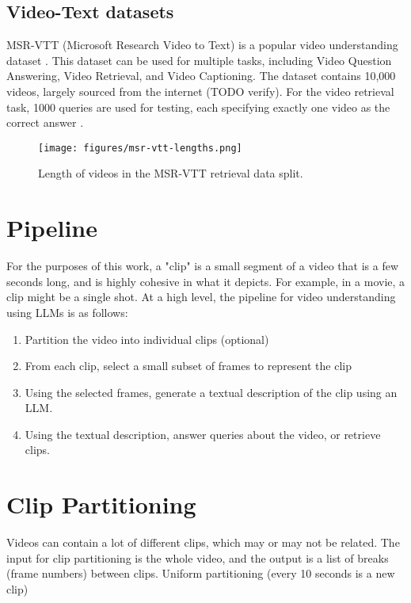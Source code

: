 \documentclass{article}
\begin{document}
\subsection{Video-Text datasets}
MSR-VTT (Microsoft Research Video to Text) is a popular video understanding dataset \cite{msr-vtt}.
This dataset can be used for multiple tasks, including Video Question Answering, Video Retrieval, and Video Captioning.
The dataset contains 10,000 videos, largely sourced from the internet (TODO verify).
For the video retrieval task, 1000 queries are used for testing, each specifying exactly one video as the correct answer \cite{jsfusion}.


\begin{figure}
      \centering
      \texttt{[image: figures/msr-vtt-lengths.png]}
      \caption{Length of videos in the MSR-VTT retrieval data split.}
      \label{fig:optical_flow}
\end{figure}

\section{Pipeline}


For the purposes of this work, a "clip" is a small segment of a video that is a few seconds long, 
and is highly cohesive in what it depicts. For example, in a movie, a clip might be a single shot.
At a high level, the pipeline for video understanding using LLMs is as follows:
\begin{enumerate}
      \item Partition the video into individual clips (optional)
      \item From each clip, select a small subset of frames to represent the clip
      \item Using the selected frames, generate a textual description of the clip using an LLM.
      \item Using the textual description, answer queries about the video, or retrieve clips.
\end{enumerate}



\section{Clip Partitioning}

Videos can contain a lot of different clips, which may or may not be related.
The input for clip partitioning is the whole video, and the output is a list of breaks (frame numbers) between clips.
Uniform partitioning (every 10 seconds is a new clip)
\end{document}
